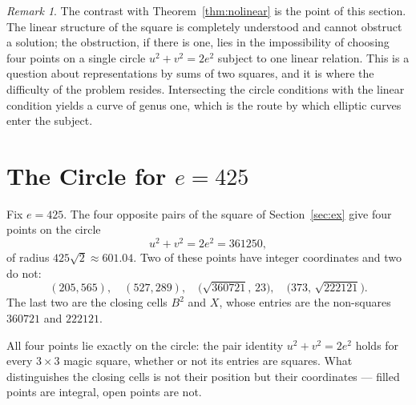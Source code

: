 \documentclass[12pt]{article}
\theoremstyle{remark}
\newtheorem{remark}[theorem]{Remark}
\begin{document}
\begin{remark}
The contrast with Theorem~\ref{thm:nolinear} is the point of this
section. The linear structure of the square is completely understood
and cannot obstruct a solution; the obstruction, if there is one, lies
in the impossibility of choosing four points on a single circle
$u^2+v^2=2e^2$ subject to one linear relation. This is a question about
representations by sums of two squares, and it is where the difficulty
of the problem resides. Intersecting the circle conditions with the
linear condition yields a curve of genus one, which is the route by
which elliptic curves enter the subject.
\end{remark}

\section{The Circle for $e = 425$}

Fix $e = 425$. The four opposite pairs of the square of
Section~\ref{sec:ex} give four points on the circle
\[
u^2 + v^2 = 2e^2 = 361250 ,
\]
of radius $425\sqrt2 \approx 601.04$. Two of these points have integer
coordinates and two do not:
\[
(205, 565), \quad (527, 289), \quad
\bigl(\sqrt{360721},\, 23\bigr), \quad
\bigl(373,\, \sqrt{222121}\bigr).
\]
The last two are the closing cells $B^2$ and $X$, whose entries are the
non-squares $360721$ and $222121$.

\begin{center}
\end{center}

All four points lie exactly on the circle: the pair identity
$u^2 + v^2 = 2e^2$ holds for every $3\times3$ magic square, whether or
not its entries are squares. What distinguishes the closing cells is
not their position but their coordinates --- filled points are integral,
open points are not.
\end{document}
